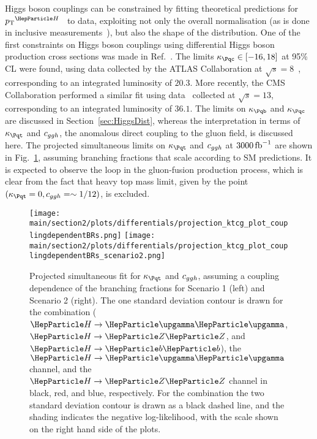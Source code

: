 Higgs boson couplings can be constrained by fitting theoretical predictions for $\pTH$~\cite{Bishara:2016jga,Grazzini:2017szg,Grazzini:2016paz} to data, exploiting not only the overall normalisation (as is done in inclusive measurements~\cite{%
Khachatryan:2016vau,%
Aad:2015zhl,%
CMS:2018lkl%
}), but also the shape of the distribution.
% 
One of the first constraints on Higgs boson couplings using differential Higgs boson production cross sections was made in Ref.~\cite{Bishara:2016jga}.
% 
The limits $\kappac \in [ -16, 18 ]$ at 95\% CL were found, using data collected by the ATLAS Collaboration at $\sqrt{s}=8$\UTeV~\cite{Aad:2015lha}, corresponding to an integrated luminosity of $20.3$\fbinv.
% 
More recently, the CMS Collaboration performed a similar fit using data~\cite{CMS-PAS-HIG-17-028} collected at $\sqrt{s}=13$\UTeV, corresponding to an integrated luminosity of $36.1$\fbinv.
% 
The limits on $\kappab$ and $\kappac$ are discussed in Section~\ref{sec:HiggsDist}, whereas the interpretation in terms of $\kappat$ and $c_{ggh}$, the anomalous direct coupling to the gluon field, is discussed here.
% 
The projected simultaneous limits on $\kappat$ and $c_{ggh}$ at $3000\mbox{\ensuremath{\,\text{fb}^\text{$-$1}}}$ are shown in Fig.~\ref{fig:ktcg_couplingdependentBRs}, assuming branching fractions that scale according to SM predictions.
% 
It is expected to observe the loop in the gluon-fusion production process, which is clear from the fact that heavy top mass limit, given by the point $(\kappat =0, \cg=\sim 1/12)$, is excluded.

\begin{figure}[hbtp]
  \begin{center}
    \texttt{[image: \\main/section2/plots/differentials/projection\_ktcg\_plot\_couplingdependentBRs.png]}
    \texttt{[image: \\main/section2/plots/differentials/projection\_ktcg\_plot\_couplingdependentBRs\_scenario2.png]}
    \caption{
        Projected simultaneous fit for $\kappat$ and $c_{ggh}$, assuming a coupling dependence of the branching fractions for Scenario 1 (left) and Scenario 2 (right).
        The one standard deviation contour is drawn for the combination ($\hgg$, $\hzz$, and $\hbb$), the $\hgg$ channel, and the $\hzz$ channel in black, red, and blue, respectively.
        For the combination the two standard deviation contour is drawn as a black dashed line, and the shading indicates the negative log-likelihood, with the scale shown on the right hand side of the plots.
        }
    \label{fig:ktcg_couplingdependentBRs}
  \end{center}
\end{figure}

